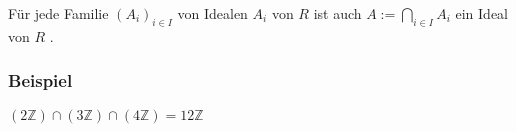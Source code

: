 \documentclass[12pt]{article}
\begin{document}
\begin{theorem}
	Für jede Familie $ \left( A_{i} \right)_{i \in I} $ von Idealen $ A_{i} $ von $ R $ ist auch 
	$ A := \bigcap\limits_{ i \in  I}^{ } A_{i}  $ ein Ideal von $ R $ .
\end{theorem}
\subsubsection*{Beispiel}
$ \left( 2 \mathbb{Z}  \right) \cap \left( 3 \mathbb{Z}  \right) \cap \left( 4 \mathbb{Z}  \right) = 12 \mathbb{Z}  $
 
\end{document}
